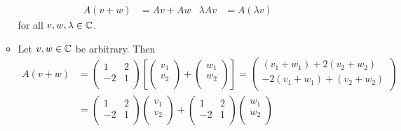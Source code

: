 \documentclass[../notes.tex]{subfiles}
\begin{document}
\begin{itemize}
\begin{itemize}
        \begin{align*}
            A(v+w) &= Av+Aw&
            \lambda Av &= A(\lambda v)
        \end{align*}
        for all $v,w,\lambda\in\mathbb{C}$.
        \item Let $v,w\in\mathbb{C}$ be arbitrary. Then
        \begin{align*}
            A(v+w) &=
            \begin{pmatrix}
                1 & 2\\
                -2 & 1\\
            \end{pmatrix}
            \left[
                \begin{pmatrix}
                    v_1\\
                    v_2\\
                \end{pmatrix}
                +
                \begin{pmatrix}
                    w_1\\
                    w_2\\
                \end{pmatrix}
            \right]
            =
            \begin{pmatrix}
                (v_1+w_1)+2(v_2+w_2)\\
                -2(v_1+w_1)+(v_2+w_2)\\
            \end{pmatrix}\\
            &=
            \begin{pmatrix}
                1 & 2\\
                -2 & 1\\
            \end{pmatrix}
            \begin{pmatrix}
                v_1\\
                v_2\\
            \end{pmatrix}
            +
            \begin{pmatrix}
                1 & 2\\
                -2 & 1\\
            \end{pmatrix}
            \begin{pmatrix}
                w_1\\
                w_2\\

\end{pmatrix}
\end{align*}
\end{itemize}
\end{itemize}
\end{document}
